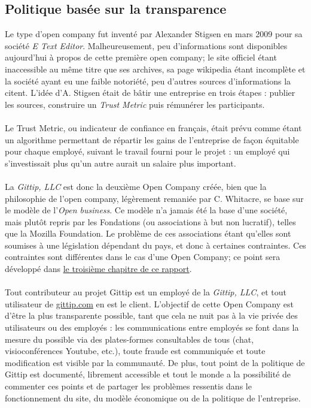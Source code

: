     \subsection{Politique basée sur la transparence}

Le type d'open company fut inventé par Alexander Stigsen en mars 2009 pour sa
société \emph{E Text Editor}. Malheureusement, peu d'informations sont
disponibles aujourd'hui à propos de cette première open company; le site
officiel étant inaccessible au même titre que ses archives, sa page wikipedia
étant incomplète et la société ayant eu une faible notoriété, peu d'autres sources
d'informations la citent. L'idée d'A. Stigsen était de bâtir une entreprise en
trois étapes : publier les sources, construire un \emph{Trust Metric} puis
rémunérer les participants.

\paragraph{}
Le Trust Metric, ou indicateur de confiance en français, était prévu comme
étant un algorithme permettant de répartir les gains de l'entreprise
de façon équitable pour chaque employé, suivant le travail fourni pour
le projet : un employé qui s'investissait plus qu'un autre aurait un salaire
plus important.

\paragraph{}
La \emph{Gittip, LLC} est donc la deuxième Open Company créée, bien que la
philosophie de l'open company, légèrement remaniée par C. Whitacre, se base sur
le modèle de l'\emph{Open business}. Ce modèle n'a jamais été la base d'une
société, mais plutôt repris par les Fondations (ou associations à but non
lucratif), telles que la Mozilla Foundation. Le problème de ces associations
étant qu'elles sont soumises à une législation dépendant du pays, et donc à
certaines contraintes. Ces contraintes sont différentes dans le cas d'une Open
Company; ce point sera développé dans \hyperref[chapter3]{le troisième chapitre
de ce rapport}.

\paragraph{}
Tout contributeur au projet Gittip est un employé de la \emph{Gittip, LLC}, et
tout utilisateur de \url{gittip.com} en est le client. L'objectif de cette Open
Company est d'être la plus transparente possible, tant que cela ne nuit pas à
la vie privée des utilisateurs ou des employés : les communications entre
employés se font dans la mesure du possible via des plates-formes consultables de
tous (chat, visioconférences Youtube, etc.), toute fraude est communiquée
et toute modification est visible par la communauté.
De plus, tout point de la politique de Gittip est documenté, librement accessible
et tout le monde a la possibilité de commenter ces points et de partager les
problèmes ressentis dans le fonctionnement du site, du modèle économique ou de
la politique de l'entreprise.

